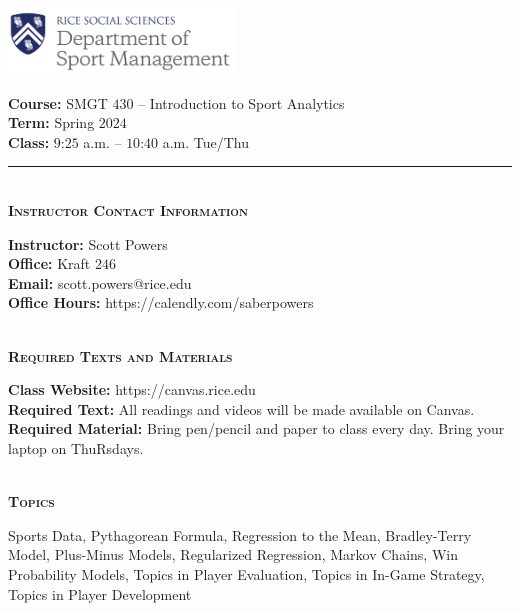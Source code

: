\documentclass[11pt]{article}
\begin{document}
\begin{multicols}{2}

	\includegraphics[width = 0.45\textwidth]{../../images/rice_smgt.png}

	\columnbreak

	\raggedleft
	{\bf Course:} SMGT $430$ -- Introduction to Sport Analytics\\
	{\bf Term:} Spring $2024$\\
	{\bf Class:} $9$:$25$ a.m. -- $10$:$40$ a.m. Tue/Thu

\end{multicols}

\hrule

~\\
\textbf{\textsc{Instructor Contact Information}}
\begin{adjustwidth}{1cm}{0cm}
	{\bf Instructor:} Scott Powers\\
  {\bf Office:} Kraft $246$\\
  {\bf Email:} scott.powers@rice.edu\\
  {\bf Office Hours:} https://calendly.com/saberpowers
\end{adjustwidth}

~\\
\textbf{\textsc{Required Texts and Materials}}
\begin{adjustwidth}{1cm}{0cm}
	{\bf Class Website:} https://canvas.rice.edu\\
	{\bf Required Text:} All readings and videos will be made available on Canvas.\\
	{\bf Required Material:} Bring pen/pencil and paper to class every day. Bring your laptop on ThuRsdays.
\end{adjustwidth}

~\\
\textbf{\textsc{Topics}}
\begin{adjustwidth}{1cm}{0cm}
	Sports Data, Pythagorean Formula, Regression to the Mean, Bradley-Terry Model, Plus-Minus Models, Regularized Regression, Markov Chains, Win Probability Models, Topics in Player Evaluation, Topics in In-Game Strategy, Topics in Player Development
\end{adjustwidth}
\end{document}
